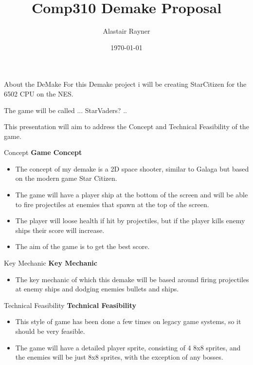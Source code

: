 \documentclass{beamer}
\title{Comp310 Demake Proposal}
\author{Alastair Rayner}
\date{\today}
\begin{document}
\maketitle


\begin{frame}{About the DeMake}
	  For this Demake project i will be creating StarCitizen for the 6502 CPU on the NES. \pause
	  
	  The game will be called ... StarVaders? ..\pause
	  
	
	 This presentation will aim to address the Concept and Technical Feasibility of the game. \pause
\end{frame}


\begin{frame}{Concept}		
	\textbf{Game Concept} \pause
		\begin{itemize}
			\item The concept of my demake is a 2D space shooter, similar to Galaga but based on the modern game Star Citizen.  \pause
			\item The game will have a player ship at the bottom of the screen and will be able to fire projectiles at enemies that spawn at the top of the screen.\pause
			
			\item The player will loose health if hit by projectiles, but if the player kills enemy ships their score will increase.  \pause

			\item The aim of the game is to get the best score. \pause 	
		\end{itemize}
\end{frame}

\begin{frame}{Key Mechanic}		
	\textbf{Key Mechanic} \pause
		\begin{itemize}
			\item The key mechanic of which this demake will be based around firing projectiles at enemy ships and dodging enemies bullets and ships.  \pause

		\end{itemize}
\end{frame}

\begin{frame}{Technical Feasibility}		
	\textbf{Technical Feasibility} \pause
		\begin{itemize}
			\item This style of game has been done a few times on legacy game systems, so it should be very feasible.  \pause
			\item The game will have a detailed player sprite, consisting of 4 8x8 sprites, and the enemies will be just 8x8 sprites, with the exception of any bosses.  \pause
		\end{itemize}
\end{frame}
\end{document}
